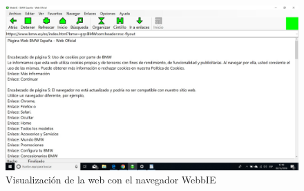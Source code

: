 \documentclass[a4paper,11pt]{article}
\begin{document}
\begin{itemize}
    \begin{figure}[H]
      \centering
      \includegraphics[scale=0.25]{audio.jpeg}
      \caption{Visualización de la web con el navegador WebbIE}
      \label{fig:nicss}
      \end{figure}
\end{itemize}
\end{document}
